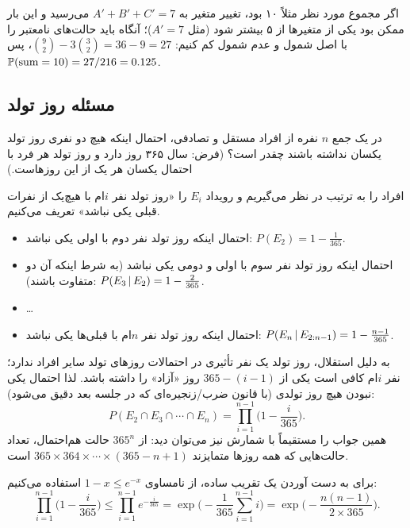 \begin{note}
\notetitle اگر مجموع مورد نظر مثلاً ۱۰ بود، تغییر متغیر به $A'+B'+C'=7$ می‌رسید و این بار ممکن بود یکی از متغیرها از ۵ بیشتر شود (مثل $A'=7$)؛ آنگاه باید حالت‌های نامعتبر را با اصل شمول و عدم شمول کم کنیم: $\binom92-3\binom32=36-9=27$، پس $\mathbb{P}(\text{sum}=10)=27/216=0.125$.
\end{note}

\subsection{مسئله روز تولد }

\begin{example}
در یک جمع $n$ نفره از افراد مستقل و تصادفی، احتمال اینکه هیچ دو نفری روز تولد یکسان نداشته باشند چقدر است؟ (فرض: سال ۳۶۵ روز دارد و روز تولد هر فرد با احتمال یکسان هر یک از این روزهاست.)
\begin{solution}
افراد را به ترتیب در نظر می‌گیریم و رویداد $E_i$ را «روز تولد نفر $i$ام با هیچ‌یک از نفرات قبلی یکی نباشد» تعریف می‌کنیم.
\begin{itemize}
\item احتمال اینکه روز تولد نفر دوم با اولی یکی نباشد: $P(E_2)=1-\frac1{365}$.
\item احتمال اینکه روز تولد نفر سوم با اولی و دومی یکی نباشد (به شرط اینکه آن دو متفاوت باشند): $P(E_3\,|\, E_2)=1-\frac{2}{365}$.
\item \ldots
\item احتمال اینکه روز تولد نفر $n$ام با قبلی‌ها یکی نباشد: $P(E_n\,|\, E_{2:n-1})=1-\frac{n-1}{365}$.
\end{itemize}
به دلیل استقلال، روز تولد یک نفر تأثیری در احتمالات روزهای تولد سایر افراد ندارد؛ نفر $i$ام کافی است یکی از $365-(i-1)$ روز «آزاد» را داشته باشد. لذا احتمال یکی نبودن هیچ روز تولدی (با قانون ضرب/زنجیره‌ای که در جلسه بعد دقیق می‌شود):
\[
P(E_2\cap E_3\cap\cdots\cap E_n)=\prod_{i=1}^{n-1}\Big(1-\frac{i}{365}\Big).
\]
همین جواب را مستقیماً با شمارش نیز می‌توان دید: از $365^n$ حالت هم‌احتمال، تعداد حالت‌هایی که همه روزها متمایزند $365\times364\times\cdots\times(365-n+1)$ است.

برای به دست آوردن یک تقریب ساده، از نامساوی $1-x\le e^{-x}$ استفاده می‌کنیم:
\[
\prod_{i=1}^{n-1}\Big(1-\frac{i}{365}\Big)\le\prod_{i=1}^{n-1}e^{-\frac{i}{365}}=\exp\Big(-\frac{1}{365}\sum_{i=1}^{n-1}i\Big)=\exp\Big(-\frac{n(n-1)}{2\times365}\Big).
\]
\end{solution}
\end{example}

